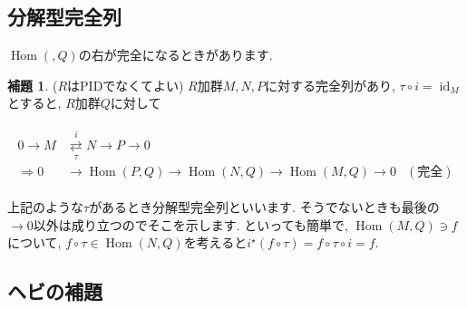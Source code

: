 \documentclass{jsarticle}
\newcommand{\makeop}[1]{\mathop{\mathrm{#1}}\nolimits}
\def\Hom{\makeop{Hom}}
\def\id{\makeop{id}}
\theoremstyle{definition}
\newtheorem{lemma}{補題}
\numberwithin{theorem}{section}
\begin{document}
\subsection{分解型完全列}
$\Hom(, Q)$の右が完全になるときがあります.

\begin{lemma}
($R$はPIDでなくてよい) $R$加群$M, N, P$に対する完全列があり, $\tau\circ i = \id_M$とすると, $R$加群$Q$に対して

\begin{eqnarray*}
\begin{aligned}
0 \rightarrow M &\overset{i}{\underset{\tau}{\rightleftarrows}} N \rightarrow P \rightarrow 0\\
\Rightarrow 0 &\rightarrow \Hom(P, Q) \rightarrow \Hom(N, Q) \rightarrow \Hom(M, Q) \rightarrow 0 &(完全)
\end{aligned}
\end{eqnarray*}
\end{lemma}

上記のような$\tau$があるとき分解型完全列といいます. そうでないときも最後の$\rightarrow 0$以外は成り立つのでそこを示します.
といっても簡単で, $\Hom(M, Q) \ni f$について, $f\circ\tau \in \Hom(N, Q)$を考えると$i^\star(f\circ\tau) = f\circ\tau\circ i = f$.

\subsection{ヘビの補題}
\end{document}
